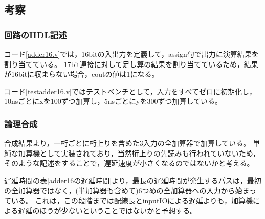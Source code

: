 \subsection{考察}
\subsubsection{回路のHDL記述}
コード\ref{adder16.v}では，16bitの入出力を定義して，assign句で出力に演算結果を割り当てている。
17bit連接に対して足し算の結果を割り当てているため，結果が16bitに収まらない場合，coutの値は1になる。

コード\ref{testadder16.v}ではテストベンチとして，入力をすべてゼロに初期化し，10nsごとにxを100ずつ加算し，5nsごとにyを300ずつ加算している。

\subsubsection{論理合成}
合成結果より，一桁ごとに桁上りを含めた3入力の全加算器で加算している。
単純な加算機として実装されており，当然桁上りの先読みも行われていないため，そのような記述をすることで，遅延速度が小さくなるのではないかと考える。

遅延時間の表\ref{adder16の遅延時間}より，最長の遅延時間が発生するパスは，最初の全加算器ではなく，(半加算器も含めて)6つめの全加算器への入力から始まっている。
これは，この段階までは配線長とinputIOによる遅延よりも，加算機による遅延のほうが少ないということではないかと予想する。
